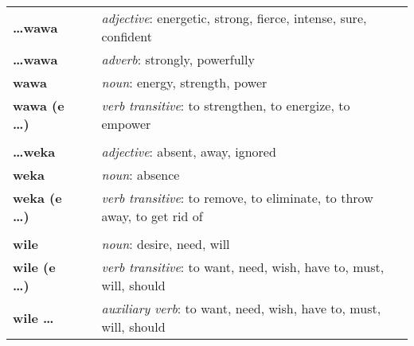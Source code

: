 \begin{supertabular}{p{2,5cm}|ll}
    \textbf{\dots wawa}          &  & \textit{adjective}: energetic, strong, fierce, intense, sure, confident                                    \\
    \textbf{\dots wawa}          &  & \textit{adverb}: strongly, powerfully                                                                      \\
    \textbf{wawa}                &  & \textit{noun}: energy, strength, power                                                                     \\
    \textbf{wawa (e \dots)}      &  & \textit{verb transitive}: to strengthen, to energize, to empower                                           \\
                                 &  &                                                                                                            \\ %
    \textbf{\dots weka}          &  & \textit{adjective}: absent, away, ignored                                                                  \\
    \textbf{weka}                &  & \textit{noun}: absence                                                                                     \\
    \textbf{weka (e \dots)}      &  & \textit{verb transitive}: to remove, to eliminate, to throw away, to get rid of                            \\
                                 &  &                                                                                                            \\ %
    \textbf{wile}                &  & \textit{noun}: desire, need, will                                                                          \\
    \textbf{wile (e \dots)}      &  & \textit{verb transitive}: to want, need, wish, have to, must, will, should                                 \\
    \textbf{wile \dots}          &  & \textit{auxiliary verb}: to want, need, wish, have to, must, will, should                                  \\
\end{supertabular} \\
%
